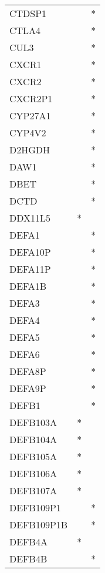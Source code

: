 \begin{longtable}{lcc}
CTDSP1         &           &       * \\
CTLA4          &           &       * \\
CUL3           &           &       * \\
CXCR1          &           &       * \\
CXCR2          &           &       * \\
CXCR2P1        &           &       * \\
CYP27A1        &           &       * \\
CYP4V2         &           &       * \\
D2HGDH         &           &       * \\
DAW1           &           &       * \\
DBET           &           &       * \\
DCTD           &           &       * \\
DDX11L5        &         * &         \\
DEFA1          &           &       * \\
DEFA10P        &           &       * \\
DEFA11P        &           &       * \\
DEFA1B         &           &       * \\
DEFA3          &           &       * \\
DEFA4          &           &       * \\
DEFA5          &           &       * \\
DEFA6          &           &       * \\
DEFA8P         &           &       * \\
DEFA9P         &           &       * \\
DEFB1          &           &       * \\
DEFB103A       &         * &         \\
DEFB104A       &         * &         \\
DEFB105A       &         * &         \\
DEFB106A       &         * &         \\
DEFB107A       &         * &         \\
DEFB109P1      &           &       * \\
DEFB109P1B     &           &       * \\
DEFB4A         &         * &         \\
DEFB4B         &           &       * \\

\end{longtable}
